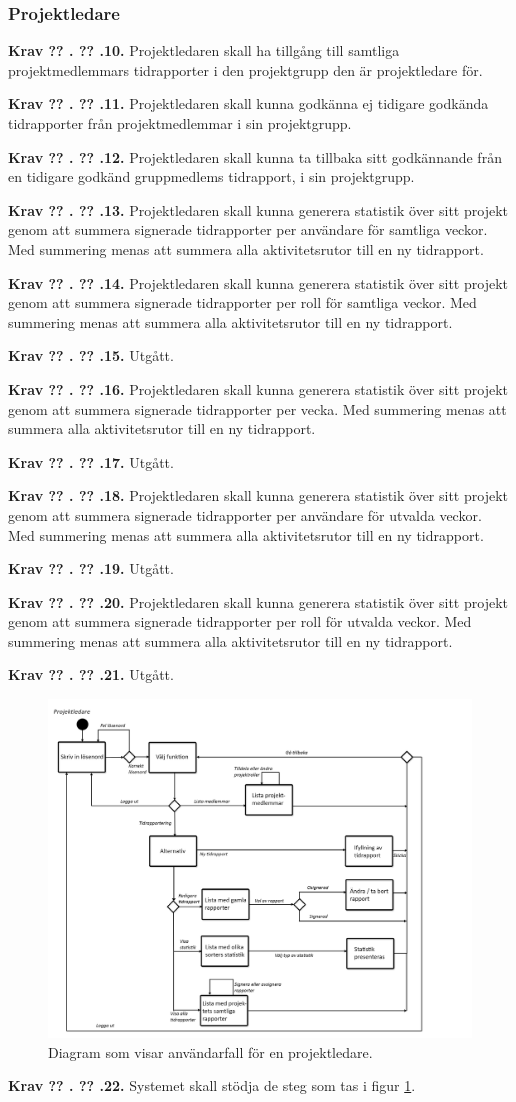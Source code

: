 \documentclass[a4paper]{article}
\newcommand\getcurrentref[1]{%
 \ifnumequal{\value{#1}}{0}
  {??}
  {\the\value{#1}}%
}
\newcommand\requirement[2]{
	\numberedrow{Krav}{#1}{#2}
}
\newcommand\numberedrow[3]{
	\noindent
	\textbf{#1 \getcurrentref{section}.\getcurrentref{subsection}.#2.} #3
	
}
\begin{document}
		\subsubsection*{Projektledare}
			\requirement{10}{Projektledaren skall ha tillgång till samtliga projektmedlemmars tidrapporter i den projektgrupp den är projektledare för.}
			\requirement{11}{Projektledaren skall kunna godkänna ej tidigare godkända tidrapporter från projektmedlemmar i sin projektgrupp.}
			\requirement{12}{Projektledaren skall kunna ta tillbaka sitt godkännande från en tidigare godkänd gruppmedlems tidrapport, i sin projektgrupp.}
			\requirement{13}{Projektledaren skall kunna generera statistik över sitt projekt genom att summera signerade tidrapporter per användare för samtliga veckor. Med summering menas att summera alla aktivitetsrutor till en ny tidrapport.}
			\requirement{14}{Projektledaren skall kunna generera statistik över sitt projekt genom att summera signerade tidrapporter per roll för samtliga veckor. Med summering menas att summera alla aktivitetsrutor till en ny tidrapport.}
			\requirement{15}{Utgått.}
			\requirement{16}{Projektledaren skall kunna generera statistik över sitt projekt genom att summera signerade tidrapporter per vecka. Med summering menas att summera alla aktivitetsrutor till en ny tidrapport.}
			\requirement{17}{Utgått.}
			\requirement{18}{Projektledaren skall kunna generera statistik över sitt projekt genom att summera signerade tidrapporter per användare för utvalda veckor. Med summering menas att summera alla aktivitetsrutor till en ny tidrapport.}
			\requirement{19}{Utgått.}
			\requirement{20}{Projektledaren skall kunna generera statistik över sitt projekt genom att summera signerade tidrapporter per roll för utvalda veckor. Med summering menas att summera alla aktivitetsrutor till en ny tidrapport.}
			\requirement{21}{Utgått.}

			\begin{figure}[H]
				\centering
				\includegraphics[width=\textwidth]{flow_time_proj_leader}
				\caption{Diagram som visar användarfall för en projektledare.}
				\label{image_time_proboss}
			\end{figure}
		\requirement{22}{Systemet skall stödja de steg som tas i figur \ref{image_time_proboss}.}
\end{document}
